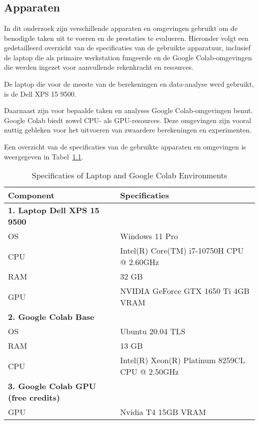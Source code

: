 
\chapter{}%
\label{ch:proof of concept}

\section{Apparaten}
In dit onderzoek zijn verschillende apparaten en omgevingen gebruikt om de benodigde taken uit te voeren en de prestaties te evalueren. Hieronder volgt een gedetailleerd overzicht van de specificaties van de gebruikte apparatuur, inclusief de laptop die als primaire werkstation fungeerde en de Google Colab-omgevingen die werden ingezet voor aanvullende rekenkracht en resources.

De laptop die voor de meeste van de berekeningen en data-analyse werd gebruikt, is de Dell XPS 15 9500. 

Daarnaast zijn voor bepaalde taken en analyses Google Colab-omgevingen benut. Google Colab biedt zowel CPU- als GPU-resources. Deze omgevingen zijn vooral nuttig gebleken voor het uitvoeren van zwaardere berekeningen en experimenten.

Een overzicht van de specificaties van de gebruikte apparaten en omgevingen is weergegeven in Tabel~\ref{tab:specificaties}.

\begin{table}[H]
    \centering
    \begin{tabular}{|l|l|}
        \hline
        \textbf{Component} & \textbf{Specificaties} \\ \hline
        \textbf{1. Laptop Dell XPS 15 9500} & \\
        \quad OS & Windows 11 Pro \\
        \quad CPU & Intel(R) Core(TM) i7-10750H CPU @ 2.60GHz \\
        \quad RAM & 32 GB \\
        \quad GPU & NVIDIA GeForce GTX 1650 Ti 4GB VRAM \\ \hline
        \textbf{2. Google Colab Base} & \\
        \quad OS & Ubuntu 20.04 TLS \\
        \quad RAM & 13 GB \\
        \quad CPU & Intel(R) Xeon(R) Platinum 8259CL CPU @ 2.50GHz \\ \hline
        \textbf{3. Google Colab GPU (free credits)} & \\
        \quad GPU & Nvidia T4 15GB VRAM \\ \hline
    \end{tabular}
    \caption{Specificaties of Laptop and Google Colab Environments}
    \label{tab:specificaties}
\end{table}

